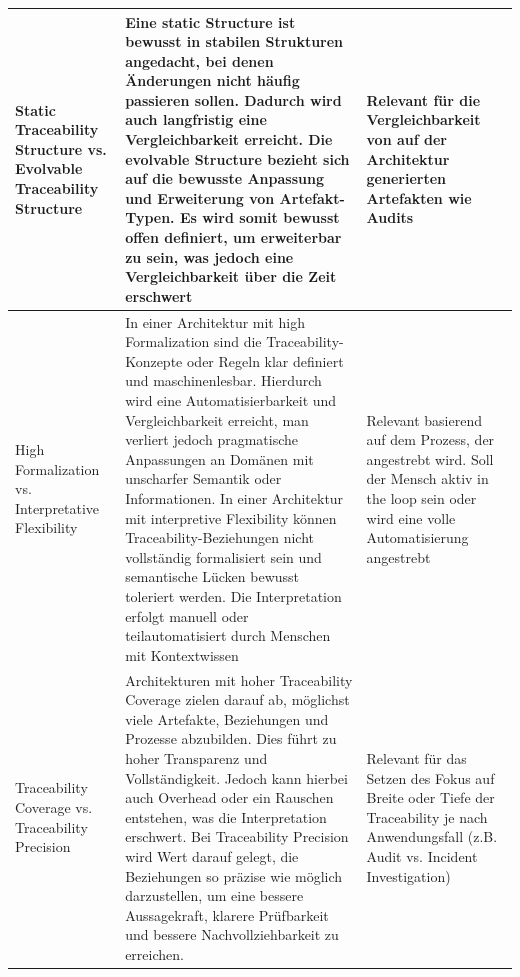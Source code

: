 \begin{longtable}{|
  L{3cm}|
  p{\dimexpr\textwidth-6cm-6\arrayrulewidth\relax}|
  L{3cm}|
}
    Static Traceability Structure vs. Evolvable Traceability Structure &
    Eine static Structure ist bewusst in stabilen Strukturen angedacht, bei denen Änderungen nicht häufig passieren sollen. Dadurch wird auch langfristig eine Vergleichbarkeit erreicht. Die evolvable Structure bezieht sich auf die bewusste Anpassung und Erweiterung von Artefakt-Typen. Es wird somit bewusst offen definiert, um erweiterbar zu sein, was jedoch eine Vergleichbarkeit über die Zeit erschwert &
    Relevant für die Vergleichbarkeit von auf der Architektur generierten Artefakten wie Audits
    \\
    \hline

    High Formalization vs. Interpretative Flexibility &
    In einer Architektur mit high Formalization sind die Traceability-Konzepte oder Regeln klar definiert und maschinenlesbar. Hierdurch wird eine Automatisierbarkeit und Vergleichbarkeit erreicht, man verliert jedoch pragmatische Anpassungen an Domänen mit unscharfer Semantik oder Informationen. In einer Architektur mit interpretive Flexibility können Traceability-Beziehungen nicht vollständig formalisiert sein und semantische Lücken bewusst toleriert werden. Die Interpretation erfolgt manuell oder teilautomatisiert durch Menschen mit Kontextwissen &
    Relevant basierend auf dem Prozess, der angestrebt wird. Soll der Mensch aktiv in the loop sein oder wird eine volle Automatisierung angestrebt
    \\
    \hline

    Traceability Coverage vs. Traceability Precision &
    Architekturen mit hoher Traceability Coverage zielen darauf ab, möglichst viele Artefakte, Beziehungen und Prozesse abzubilden. Dies führt zu hoher Transparenz und Vollständigkeit. Jedoch kann hierbei auch Overhead oder ein Rauschen entstehen, was die Interpretation erschwert. Bei Traceability Precision wird Wert darauf gelegt, die Beziehungen so präzise wie möglich darzustellen, um eine bessere Aussagekraft, klarere Prüfbarkeit und bessere Nachvollziehbarkeit zu erreichen. &
    Relevant für das Setzen des Fokus auf Breite oder Tiefe der Traceability je nach Anwendungsfall (z.B. Audit vs. Incident Investigation)
    \\
    \hline


\end{longtable}
